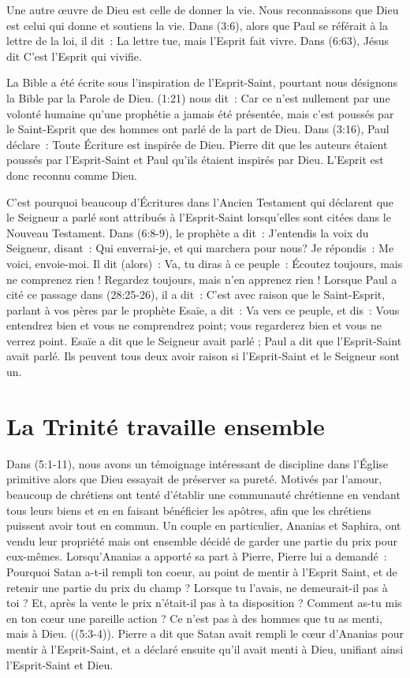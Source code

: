 Une autre œuvre de Dieu est celle de donner la vie. Nous reconnaissons que Dieu est celui qui donne et soutiens la vie. Dans (3:6), alors que Paul se référait à la lettre de la loi, il dit~: \og La lettre tue, mais l'Esprit fait vivre. \fg{} Dans (6:63), Jésus dit \og C'est l'Esprit qui vivifie.\fg{}

La Bible a été écrite sous l'inspiration de l'Esprit-Saint, pourtant nous désignons la Bible par la Parole de Dieu. (1:21) nous dit~: \og Car ce n'est nullement par une volonté humaine qu'une prophétie a jamais été présentée, mais c'est poussés par le Saint-Esprit que des hommes ont parlé de la part de Dieu. \fg{} Dans (3:16), Paul déclare~: \og Toute Écriture est inspirée de Dieu. \fg{} Pierre dit que les auteurs étaient poussés par l'Esprit-Saint et Paul qu'ils étaient inspirés par Dieu. L'Esprit est donc reconnu comme Dieu.

C'est pourquoi beaucoup d'Écritures dans l'Ancien Testament qui déclarent que le Seigneur a parlé sont attribués à l'Esprit-Saint lorsqu'elles sont citées dans le Nouveau Testament. Dans (6:8-9), le prophète a dit~: \og J'entendis la voix du Seigneur, disant~: Qui enverrai-je, et qui marchera pour nous? Je répondis~: Me voici, envoie-moi. Il dit (alors)~: Va, tu diras à ce peuple~: Écoutez toujours, mais ne comprenez rien ! Regardez toujours, mais n'en apprenez rien ! \fg{} Lorsque Paul a cité ce passage dans (28:25-26), il a dit~: \og C'est avec raison que le Saint-Esprit, parlant à vos pères par le prophète Esaïe, a dit~: Va vers ce peuple, et dis~: Vous entendrez bien et vous ne comprendrez point; vous regarderez bien et vous ne verrez point. \fg{} Esaïe a dit que le Seigneur avait parlé ; Paul a dit que l'Esprit-Saint avait parlé. Ils peuvent tous deux avoir raison si l'Esprit-Saint et le Seigneur sont un.


\section{La Trinité travaille ensemble}

Dans (5:1-11), nous avons un témoignage intéressant de discipline dans l'Église primitive alors que Dieu essayait de préserver sa pureté. Motivés par l'amour, beaucoup de chrétiens ont tenté d'établir une communauté chrétienne en vendant tous leurs biens et en en faisant bénéficier les apôtres, afin que les chrétiens puissent avoir tout en commun. Un couple en particulier, Ananias et Saphira, ont vendu leur propriété mais ont ensemble décidé de garder une partie du prix pour eux-mêmes. Lorsqu'Ananias a apporté sa part à Pierre, Pierre lui a demandé~: \og Pourquoi Satan a-t-il rempli ton coeur, au point de mentir à l'Esprit Saint, et de retenir une partie du prix du champ ? Lorsque tu l'avais, ne demeurait-il pas à toi ? Et, après la vente le prix n'était-il pas à ta disposition ? Comment as-tu mis en ton cœur une pareille action ? Ce n'est pas à des hommes que tu as menti, mais à Dieu.  \fg{} ((5:3-4)). Pierre a dit que Satan avait rempli le cœur d'Ananias pour mentir à l'Esprit-Saint, et a déclaré ensuite qu'il avait menti à Dieu, unifiant ainsi l'Esprit-Saint et Dieu.

